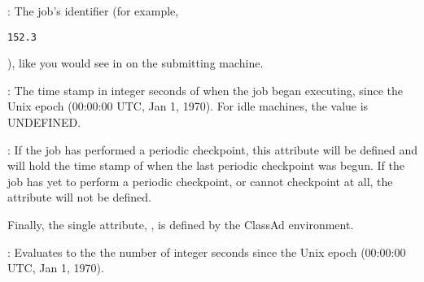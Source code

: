 \begin{description}

\item[\AdAttr{JobId}] : The job's identifier (for example,
\begin{verbatim}152.3\end{verbatim}), like you would see in 
on the submitting machine.

\item[\AdAttr{JobStart}] : The time stamp in integer seconds of when the job began
executing, since the Unix epoch (00:00:00 UTC, Jan 1, 1970).  For idle
machines, the value is UNDEFINED.

\item[\AdAttr{LastPeriodicCheckpoint}] : If the job has performed a
periodic checkpoint, this attribute will be defined and will hold the
time stamp of when the last periodic checkpoint was begun.
If the job has yet to perform a periodic checkpoint, or cannot
checkpoint at all, the  attribute will
not be defined.

\end{description}

Finally, the single attribute, 
, is defined by the ClassAd
environment.
\begin{description}
\item[\AdAttr{CurrentTime}] : Evaluates to the 
the number of integer seconds since the Unix epoch (00:00:00 UTC, Jan 1, 1970).
\end{description}
